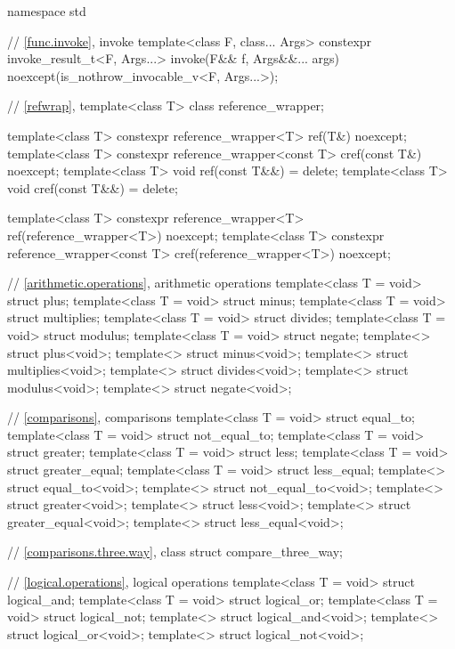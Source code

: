 %
%
%
\begin{codeblock}
namespace std {
  // \ref{func.invoke}, invoke
  template<class F, class... Args>
    constexpr invoke_result_t<F, Args...> invoke(F&& f, Args&&... args)
      noexcept(is_nothrow_invocable_v<F, Args...>);

  // \ref{refwrap}, 
  template<class T> class reference_wrapper;

  template<class T> constexpr reference_wrapper<T> ref(T&) noexcept;
  template<class T> constexpr reference_wrapper<const T> cref(const T&) noexcept;
  template<class T> void ref(const T&&) = delete;
  template<class T> void cref(const T&&) = delete;

  template<class T> constexpr reference_wrapper<T> ref(reference_wrapper<T>) noexcept;
  template<class T> constexpr reference_wrapper<const T> cref(reference_wrapper<T>) noexcept;

  // \ref{arithmetic.operations}, arithmetic operations
  template<class T = void> struct plus;
  template<class T = void> struct minus;
  template<class T = void> struct multiplies;
  template<class T = void> struct divides;
  template<class T = void> struct modulus;
  template<class T = void> struct negate;
  template<> struct plus<void>;
  template<> struct minus<void>;
  template<> struct multiplies<void>;
  template<> struct divides<void>;
  template<> struct modulus<void>;
  template<> struct negate<void>;

  // \ref{comparisons}, comparisons
  template<class T = void> struct equal_to;
  template<class T = void> struct not_equal_to;
  template<class T = void> struct greater;
  template<class T = void> struct less;
  template<class T = void> struct greater_equal;
  template<class T = void> struct less_equal;
  template<> struct equal_to<void>;
  template<> struct not_equal_to<void>;
  template<> struct greater<void>;
  template<> struct less<void>;
  template<> struct greater_equal<void>;
  template<> struct less_equal<void>;

  // \ref{comparisons.three.way}, class 
  struct compare_three_way;

  // \ref{logical.operations}, logical operations
  template<class T = void> struct logical_and;
  template<class T = void> struct logical_or;
  template<class T = void> struct logical_not;
  template<> struct logical_and<void>;
  template<> struct logical_or<void>;
  template<> struct logical_not<void>;

}
\end{codeblock}
